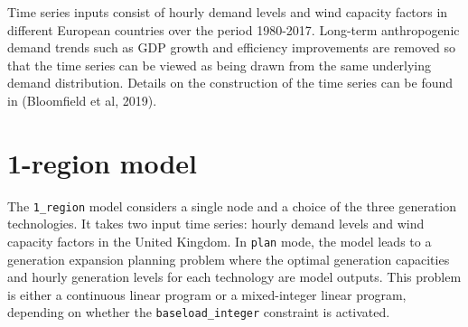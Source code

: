 \documentclass[preprint]{elsarticle}
\begin{document}
Time series inputs consist of hourly demand levels and wind capacity factors in different European countries over the period 1980-2017. Long-term anthropogenic demand trends such as GDP growth and efficiency improvements are removed so that the time series can be viewed as being drawn from the same underlying demand distribution. Details on the construction of the time series can be found in (Bloomfield et al, 2019).




\section{1-region model}

\noindent The \texttt{1\_region} model considers a single node and a choice of the three generation technologies. It takes two input time series: hourly demand levels and wind capacity factors in the United Kingdom. In \texttt{plan} mode, the model leads to a generation expansion planning problem where the optimal generation capacities and hourly generation levels for each technology are model outputs. This problem is either a continuous linear program or a mixed-integer linear program, depending on whether the \texttt{baseload\_integer} constraint is activated.
\end{document}
